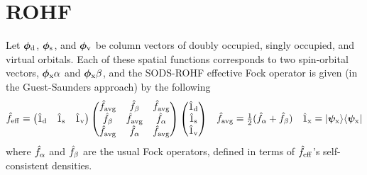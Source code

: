 \documentclass[11pt]{article}
\numberwithin{equation}{section}
\begin{document}
\section{ROHF}

Let $\bm\f_\mr{d}$, $\bm\f_\mr{s}$, and $\bm\f_\mr{v}$ be column vectors of doubly occupied, singly occupied, and virtual orbitals.
Each of these spatial functions corresponds to two spin-orbital vectors, $\bm{\f}_\mr{x}\a$ and $\bm{\f}_\mr{x}\b$, and the SODS-ROHF effective Fock operator is given (in the Guest-Saunders approach) by the following
\begin{align}
  \op{f}_\mr{eff}
\equiv
  \ma{
    \op{1}_\mr{d} &
    \op{1}_\mr{s} &
    \op{1}_\mr{v}
  }
  \ma{
    \op{f}_\mr{avg} & \op{f}_\b       &  \op{f}_\mr{avg} \\
    \op{f}_\b       & \op{f}_\mr{avg} &  \op{f}_\a       \\
    \op{f}_\mr{avg} & \op{f}_\a       &  \op{f}_\mr{avg} \\
  }
  \ma{
    \op{1}_\mr{d} \\
    \op{1}_\mr{s} \\
    \op{1}_\mr{v} \\
  }
&&
  \op{f}_\mr{avg}
\equiv
  \tfr{1}{2}
  (
    \op{f}_\a
  +
    \op{f}_\b
  )
&&
  \op{1}_\mr{x}
\equiv
  \kt{\bm\y_\mr{x}}
  \br{\bm\y_\mr{x}}
\end{align}
where $\hat{f}_{\alpha }$ and $\hat{f}_{\beta }$ are the usual Fock operators, defined in terms of $\hat{f}_{\mathrm{eff}}$'s self-consistent densities.
\end{document}
